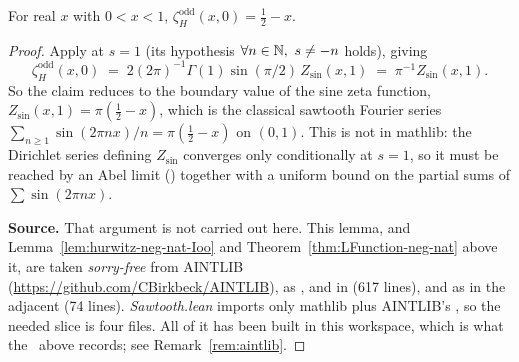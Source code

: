 \begin{lemma}
  \label{lem:hurwitzZetaOdd-zero}
  \leanok
  For real $x$ with $0 < x < 1$, $\zeta_H^{\mathrm{odd}}(x,0) = \tfrac12 - x$.
\end{lemma}
\begin{proof}
  Apply  at $s = 1$ (its hypothesis
  $\forall n \in \mathbb{N},\ s \neq -n$ holds), giving
  \[ \zeta_H^{\mathrm{odd}}(x,0) \;=\; 2 (2\pi)^{-1} \Gamma(1) \sin(\pi/2)\, Z_{\sin}(x,1)
     \;=\; \pi^{-1} Z_{\sin}(x,1). \]
  So the claim reduces to the boundary value of the sine zeta function,
  $Z_{\sin}(x,1) = \pi(\tfrac12 - x)$, which is the classical sawtooth Fourier series
  $\sum_{n \geq 1} \sin(2\pi n x)/n = \pi(\tfrac12 - x)$ on $(0,1)$. This is not in
  mathlib: the Dirichlet series defining $Z_{\sin}$ converges only conditionally at
  $s = 1$, so it must be reached by an Abel limit
  () together with a uniform bound on the
  partial sums of $\sum \sin(2\pi n x)$.

  \textbf{Source.} That argument is not carried out here. This lemma, and
  Lemma~\ref{lem:hurwitz-neg-nat-Ioo} and Theorem~\ref{thm:LFunction-neg-nat} above it,
  are taken \emph{sorry-free} from AINTLIB
  (\url{https://github.com/CBirkbeck/AINTLIB}), as
  ,
   and
   in
  (617 lines), and as  in the adjacent
   (74 lines). \emph{Sawtooth.lean} imports only
  mathlib plus AINTLIB's , so the needed
  slice is four files. All of it has been built in this workspace, which is what the
  \leanok\ above records; see Remark~\ref{rem:aintlib}.
\end{proof}

